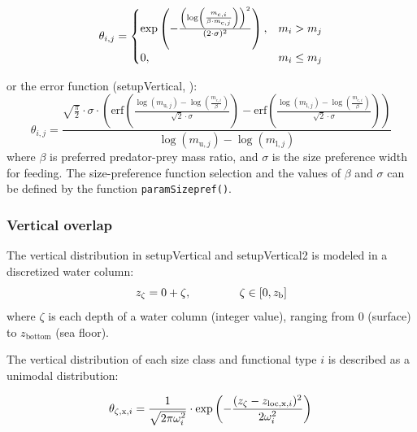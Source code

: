 \documentclass[
]{article}
\begin{document}
\begin{equation}
 \theta_{i, j} =
  \begin{cases}
\exp\left( -\frac{\left(\log\left(\frac{m_{\mathrm{c},i}}{\beta \cdot m_{\mathrm{c},j}}\right)\right)^2}{(2 \cdot \sigma)^2} \right), & \text{$ m_{i} > m_{j} $}   \\
     0, & \text{$ m_{i} \leq m_{j} $} 
  \end{cases}
\label{eq:lognormalpreference}
\end{equation}

or the error function (setupVertical,
): \begin{equation}
\theta_{i, j} = \frac{\sqrt{\frac{\pi}{2}} \cdot \sigma \cdot \left( \text{erf}\left(\frac{\log(m_{\mathrm{u},j}) - \log\left(\frac{m_{\mathrm{c},i}}{\beta}\right)}{\sqrt{2} \cdot \sigma}\right) - \text{erf}\left(\frac{\log(m_{\mathrm{l},j}) - \log\left(\frac{m_{\mathrm{c},i}}{\beta}\right)}{\sqrt{2} \cdot \sigma}\right) \right)}{\log(m_{\mathrm{u},j}) - \log(m_{\mathrm{l},j})}
\label{eq:errorpreference}
\end{equation} where \(\beta\) is preferred predator-prey mass ratio,
and \(\sigma\) is the size preference width for feeding. The
size-preference function selection and the values of \(\beta\) and
\(\sigma\) can be defined by the function \texttt{paramSizepref()}.

\subsubsection{Vertical overlap}\label{vertical-overlap}

The vertical distribution in setupVertical and setupVertical2 is modeled
in a discretized water column: \begin{equation}
z_{\mathrm{\zeta}} =  0+\zeta, \hspace{1.5cm}  \zeta\in[0,z_{\mathrm{b}}]
\end{equation} where \(\zeta\) is each depth of a water column (integer
value), ranging from \(0\) (surface) to \(z_{\mathrm{bottom}}\) (sea
floor).

The vertical distribution of each size class and functional type \(i\)
is described as a unimodal distribution:

\begin{equation}
  \theta_{\mathrm{\zeta},\mathrm{x},i} = \frac{1}{\sqrt{2\pi\omega_i^2}} \cdot \exp\left(-\frac{(z_{\mathrm{\zeta}} - z_{\mathrm{loc},\mathrm{x},i})^2}{2\omega_i^2}\right)\\
  \label{eq:vertdist1}
\end{equation}
\end{document}
